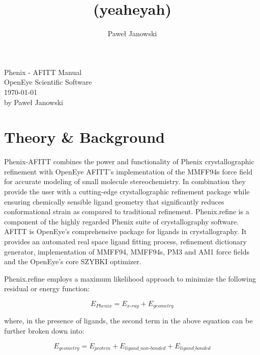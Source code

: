 \documentclass[11pt,letterpaper]{article}
\title{(yeaheyah)}
\author{Pawe\l{} Janowski}
\begin{document}
    \begin{flushright}
    \parskip 0pt
    Phenix -  AFITT Manual\\
    OpenEye Scientific Software\\
    \today\\
    by Pawe\l{} Janowski\\
    \end{flushright}
    
    

\section{Theory \&{} Background}
Phenix-AFITT combines the power and functionality of Phenix crystallographic refinement \cite{Afonine2012} with OpenEye AFITT's\cite{Wlodek2006} implementation of the MMFF94s\cite{Halgren1996} force field for accurate modeling of small molecule stereochemistry. In combination they provide the user with a cutting-edge crystallographic refinement package while ensuring chemically sensible ligand geometry that significantly reduces  conformational strain as compared to traditional refinement. Phenix.refine is a component of the highly regarded Phenix \cite{Adams2010} suite of crystallography software. AFITT is OpenEye's comprehensive package for ligands in crystallography. It provides an automated real space ligand fitting process,  refinement dictionary generator, implementation of MMFF94, MMFF94s, PM3 and AM1 force fields and the OpenEye's core SZYBKI optimizer. 

Phenix.refine employs a maximum likelihood approach to minimize the following residual or energy function:

\begin{equation}
E_{Phenix}=E_{x\text{-}ray}+E_{geometry}
\end{equation}

where, in the presence of ligands, the second term in the above equation can be further broken down into:

\begin{equation}
E_{geometry}=E_{protein}+E_{ligand\_{}non\text{-}bonded}+E_{ligand\_{}bonded}
\end{equation}
\end{document}
